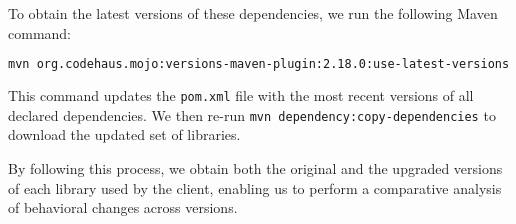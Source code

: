 To obtain the latest versions of these dependencies, we run the following Maven command:
\begin{lstlisting}[language=bash, breaklines=true, basicstyle=\ttfamily\small]
mvn org.codehaus.mojo:versions-maven-plugin:2.18.0:use-latest-versions
\end{lstlisting}
This command updates the \texttt{pom.xml} file with the most recent versions of all declared dependencies. We then re-run \texttt{mvn dependency:copy-dependencies} to download the updated set of libraries.

By following this process, we obtain both the original and the upgraded versions of each library used by the client, enabling us to perform a comparative analysis of behavioral changes across versions.

